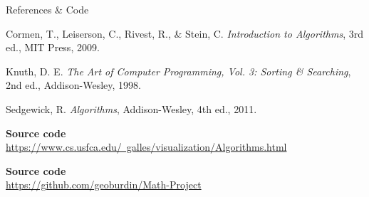 \documentclass[aspectratio=169]{beamer}
\begin{document}
\begin{frame}{References \& Code}

  \footnotesize                       %
  \begin{thebibliography}{99}         %
    Cormen, T., Leiserson, C., Rivest, R., & Stein, C.
    \emph{Introduction to Algorithms}, 3rd ed., MIT Press, 2009.

    Knuth, D. E.
    \emph{The Art of Computer Programming, Vol. 3: Sorting & Searching},
    2nd ed., Addison-Wesley, 1998.

    Sedgewick, R.
    \emph{Algorithms}, Addison-Wesley, 4th ed., 2011.
  \end{thebibliography}
\vspace{1ex}
  \textbf{Source code}\\
  \href{https://www.cs.usfca.edu/~galles/visualization/Algorithms.html}{%
    https://www.cs.usfca.edu/~galles/visualization/Algorithms.html}

  \vspace{1ex}
  \textbf{Source code}\\
  \href{https://github.com/geoburdin/Math-Project}{%
        https://github.com/geoburdin/Math-Project}
\end{frame}
\end{document}
